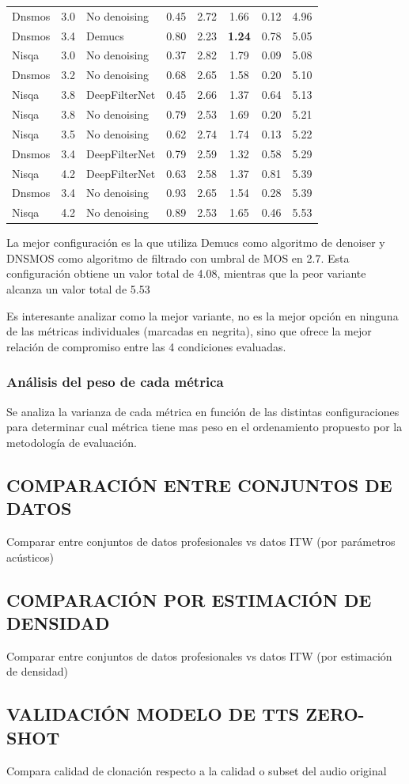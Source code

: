 \begin{table}[ht]
\begin{tabular}{@{} l S l S[table-format=1.2] S[table-format=1.2] S[table-format=1.2] S[table-format=1.2] S[table-format=1.2] @{}}
Dnsmos  & 3.0 & No denoising  & 0.45 & 2.72 & 1.66 & 0.12 & 4.96 \\
Dnsmos  & 3.4 & Demucs        & 0.80 & 2.23 & \textbf{1.24} & 0.78 & 5.05 \\
Nisqa   & 3.0 & No denoising  & 0.37 & 2.82 & 1.79 & 0.09 & 5.08 \\
Dnsmos  & 3.2 & No denoising  & 0.68 & 2.65 & 1.58 & 0.20 & 5.10 \\
Nisqa   & 3.8 & DeepFilterNet & 0.45 & 2.66 & 1.37 & 0.64 & 5.13 \\
Nisqa   & 3.8 & No denoising  & 0.79 & 2.53 & 1.69 & 0.20 & 5.21 \\
Nisqa   & 3.5 & No denoising  & 0.62 & 2.74 & 1.74 & 0.13 & 5.22 \\
Dnsmos  & 3.4 & DeepFilterNet & 0.79 & 2.59 & 1.32 & 0.58 & 5.29 \\
Nisqa   & 4.2 & DeepFilterNet & 0.63 & 2.58 & 1.37 & 0.81 & 5.39 \\
Dnsmos  & 3.4 & No denoising  & 0.93 & 2.65 & 1.54 & 0.28 & 5.39 \\
Nisqa   & 4.2 & No denoising  & 0.89 & 2.53 & 1.65 & 0.46 & 5.53 \\
\bottomrule
\end{tabular}
\end{table}

La mejor configuración es la que utiliza Demucs como algoritmo de denoiser y DNSMOS como algoritmo de filtrado con umbral de MOS en 2.7. Esta configuración obtiene un valor total de 4.08, mientras que la peor variante alcanza un valor total de 5.53

Es interesante analizar como la mejor variante, no es la mejor opción en ninguna de las métricas individuales (marcadas en negrita), sino que ofrece la mejor relación de compromiso entre las 4 condiciones evaluadas.

\subsubsection{Análisis del peso de cada métrica}
Se analiza la varianza de cada métrica en función de las distintas configuraciones para determinar cual métrica tiene mas peso en el ordenamiento propuesto por la metodología de evaluación.

\subsection{COMPARACIÓN ENTRE CONJUNTOS DE DATOS}
Comparar entre conjuntos de datos profesionales vs datos ITW (por parámetros acústicos)

\subsection{COMPARACIÓN POR ESTIMACIÓN DE DENSIDAD}
Comparar entre conjuntos de datos profesionales vs datos ITW (por estimación de densidad)

\subsection{VALIDACIÓN MODELO DE TTS ZERO-SHOT}
Compara calidad de clonación respecto a la calidad o subset del audio original
